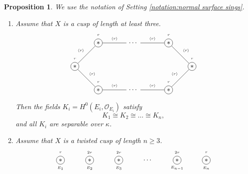 \documentclass[12pt]{amsart}
\def\ge{\geqslant}
\newcommand{\sO}{\mathcal{O}}
\theoremstyle{plain}
\newtheorem{prop}[thm]{Proposition}
\theoremstyle{definition}
\theoremstyle{remark}
\newtheorem{defn and notation}[thm]{Definition and Notation}
\theoremstyle{plain}
\numberwithin{equation}{thm}
\begin{document}
\begin{prop}\label{prop:geom red,cusp}
    We use the notation of Setting \ref{notation:normal surface sings}.
    \begin{enumerate}[label=\textup{(\arabic*)}]
    \item Assume that $X$ is a cusp of length at least three.
    \[
    \begin{tikzpicture}
\node[draw, shape=circle, inner sep=1.8pt] (A) at (0,0){$*$};
\draw[shift={(0,0.4)}] (0,0) node{\tiny $r$};
\node[draw, shape=circle, inner sep=1.8pt] (B) at (1.2,1.2){$*$};
\draw[shift={(0,0.4)}] (1.2,1.2) node{\tiny $r$};
\draw node (C) at (3,1.2){$\cdots$};
\node[draw, shape=circle, inner sep=1.8pt] (D) at (4.8 ,1.2){$*$};
\draw[shift={(0,0.4)}] (4.8,1.2) node{\tiny $r$};
\node[draw, shape=circle, inner sep=1.8pt] (E) at (6,0){$*$};
\draw[shift={(0,0.4)}] (6,0) node{\tiny $r$};
\node[draw, shape=circle, inner sep=1.8pt] (F) at (4.8,-1.2){$*$};
\draw[shift={(0,0.4)}] (4.8,-1.2) node{\tiny $r$};
\draw node (G) at (3,-1.2){$\cdots$};
\node[draw, shape=circle, inner sep=1.8pt] (H) at (1.2,-1.2){$*$};
\draw[shift={(0,0.4)}] (1.2,-1.2) node{\tiny $r$};

\draw (A) --node[auto=left]{\tiny $\langle r \rangle$} (B);
\draw (B) --node[auto=left]{\tiny $\langle r \rangle$} (C);
\draw (C) --node[auto=left]{\tiny $\langle r \rangle$} (D);
\draw (D) --node[auto=left]{\tiny $\langle r \rangle$} (E);
\draw (A) --node[auto=left]{\tiny $\langle r \rangle$} (H);
\draw (H) --node[auto=left]{\tiny $\langle r \rangle$} (G);
\draw (G) --node[auto=left]{\tiny $\langle r \rangle$} (F);
\draw (F) --node[auto=left]{\tiny $\langle r \rangle$} (E);
\end{tikzpicture}
\]
    Then the fields $K_i=H^0(E_i,\sO_{E_i})$ satisfy 
    \[
    K_1 \cong K_2 \cong \dots \cong K_n,
    \]
    and all $K_i$ are separable over $\kappa$.
    
\item Assume that $X$ is a twisted cusp of length $n\ge3$.
    \[
    \begin{tikzpicture}
\node[draw, shape=circle, inner sep=1.8pt] (X) at (-1.5,0){$*$};
\draw[shift={(0,0.4)}] (-1.5,0) node{\tiny $r$};
\draw[shift={(0,-0.4)}] (-1.5,0) node{\tiny $E_1$};
\node[draw, shape=circle, inner sep=1.8pt] (A) at (0,0){$*$};
\draw[shift={(0,0.4)}] (0,0) node{\tiny $2r$};
\draw[shift={(0,-0.4)}] (0,0) node{\tiny $E_2$};
\node[draw, shape=circle, inner sep=1.8pt] (B) at (1.5,0){$*$};
\draw[shift={(0,0.4)}] (1.5,0) node{\tiny $2r$};
\draw[shift={(0,-0.4)}] (1.5,0) node{\tiny $E_3$};
\draw node (C) at (3,0){$\cdots$};
\node[draw, shape=circle, inner sep=1.8pt] (D) at (4.5,0){$*$};
\draw[shift={(0,0.4)}] (4.5,0) node{\tiny $2r$};
\draw[shift={(0,-0.4)}] (4.5,0) node{\tiny $E_{n-1}$};
\node[draw, shape=circle, inner sep=1.8pt] (E) at (6,0){$*$};
\draw[shift={(0,0.4)}] (6,0) node{\tiny $r$};
\draw[shift={(0,-0.4)}] (6,0) node{\tiny $E_n$};


\end{tikzpicture}\]
\end{enumerate}
\end{prop}
\end{document}
